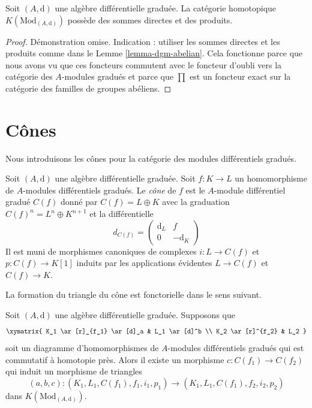 \begin{lemma}
\label{lemma-homotopy-direct-sums}
Soit $(A, \text{d})$ une algèbre différentielle graduée. La catégorie homotopique
$K(\text{Mod}_{(A, \text{d})})$ possède des sommes directes et des produits.
\end{lemma}

\begin{proof}
Démonstration omise. Indication : utiliser les sommes directes et les
produits comme dans le Lemme \ref{lemma-dgm-abelian}. Cela fonctionne parce que
nous avons vu que ces foncteurs commutent avec le foncteur d'oubli vers la
catégorie des $A$-modules gradués et parce que $\prod$ est un foncteur exact sur
la catégorie des familles de groupes abéliens.
\end{proof}







\section{Cônes}
\label{section-cones}

\noindent
Nous introduisons les cônes pour la catégorie des modules différentiels gradués.

\begin{definition}
\label{definition-cone}
Soit $(A, \text{d})$ une algèbre différentielle graduée. Soit $f : K \to L$ un
homomorphisme de $A$-modules différentiels gradués. Le {\it cône} de $f$ est le
$A$-module différentiel gradué $C(f)$ donné par $C(f) = L \oplus K$ avec la graduation
$C(f)^n = L^n \oplus K^{n + 1}$ et la différentielle
$$
d_{C(f)} =
\left(
\begin{matrix}
\text{d}_L & f \\
0 & -\text{d}_K
\end{matrix}
\right)
$$
Il est muni de morphismes canoniques de complexes $i : L \to C(f)$ et $p : C(f)
\to K[1]$ induits par les applications évidentes $L \to C(f)$ et $C(f) \to K$.
\end{definition}

\noindent
La formation du triangle du cône est fonctorielle dans le sens suivant.

\begin{lemma}
\label{lemma-functorial-cone}
Soit $(A, \text{d})$ une algèbre différentielle graduée. Supposons que
$$
\xymatrix{
K_1 \ar[r]_{f_1} \ar[d]_a & L_1 \ar[d]^b \\
K_2 \ar[r]^{f_2} & L_2
}
$$
soit un diagramme d'homomorphismes de $A$-modules différentiels gradués qui est
commutatif à homotopie près. Alors il existe un morphisme $c : C(f_1) \to C(f_2)$
qui induit un morphisme de triangles
$$
(a, b, c) : (K_1, L_1, C(f_1), f_1, i_1, p_1) \to
(K_1, L_1, C(f_1), f_2, i_2, p_2)
$$
dans $K(\text{Mod}_{(A, \text{d})})$.
\end{lemma}

